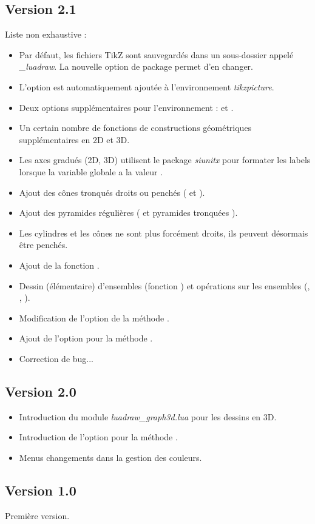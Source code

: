 \subsection{Version 2.1}
Liste non exhaustive :
\begin{itemize}
    \item Par défaut, les fichiers TikZ sont sauvegardés dans un sous-dossier appelé \emph{\_luadraw}. La nouvelle option de package  permet d'en changer.
    \item L'option  est automatiquement ajoutée à l'environnement \emph{tikzpicture}.
    \item Deux options supplémentaires pour l'environnement \luadrawenv :  et .
    \item Un certain nombre de fonctions de constructions géométriques supplémentaires en 2D et 3D.
    \item Les axes gradués (2D, 3D) utilisent le package \emph{siunitx}  pour formater les labels lorsque la variable globale  a la valeur \true.
    \item Ajout des cônes tronqués droits ou penchés ( et ).
    \item Ajout des pyramides régulières ( et pyramides tronquées ).
    \item Les cylindres et les cônes ne sont plus forcément droits, ils peuvent désormais être penchés.
    \item Ajout de la fonction .    
    \item Dessin (élémentaire) d'ensembles (fonction ) et opérations sur les ensembles (, , ).
    \item Modification de l'option  de la méthode .
    \item Ajout de l'option  pour la méthode .
    \item Correction de bug...
\end{itemize}

\subsection{Version 2.0}

\begin{itemize}
    \item Introduction du module \emph{luadraw\_graph3d.lua} pour les dessins en 3D.
    \item Introduction de l'option  pour la méthode .
    \item Menus changements dans la gestion des couleurs.
\end{itemize}

\subsection{Version 1.0}
Première version.
